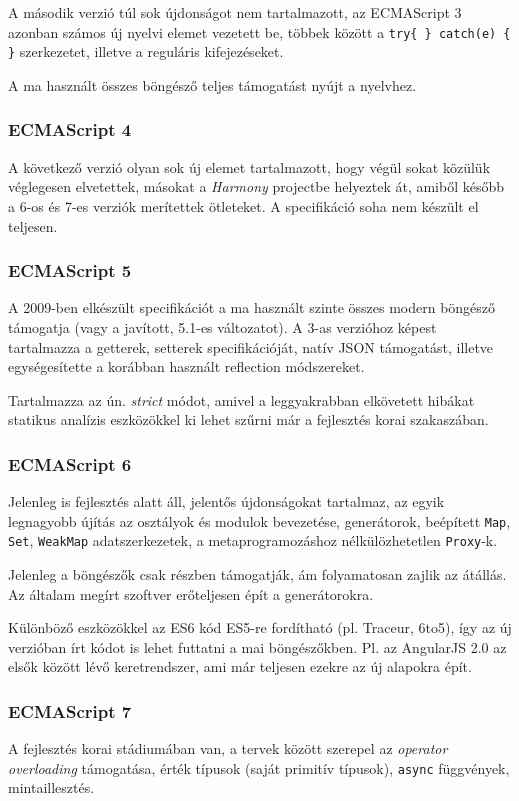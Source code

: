 A második verzió túl sok újdonságot nem tartalmazott, az ECMAScript 3 azonban
számos új nyelvi elemet vezetett be\cite{ECMAScript-3}, többek között
a \verb=try{ } catch(e) { }= szerkezetet, illetve a reguláris kifejezéseket.

A ma használt összes böngésző teljes támogatást nyújt a nyelvhez.

\subsubsection{ECMAScript 4}

A következő verzió olyan sok új elemet tartalmazott, hogy végül sokat közülük
véglegesen elvetettek, másokat a \emph{Harmony} projectbe helyeztek át,
amiből később a 6-os és 7-es verziók merítettek ötleteket.
A specifikáció soha nem készült el teljesen.

\subsubsection{ECMAScript 5}

A 2009-ben elkészült specifikációt a ma használt szinte összes modern böngésző 
támogatja (vagy a javított, 5.1-es változatot\cite{ECMAScript-5}).
A 3-as verzióhoz képest tartalmazza a getterek, setterek specifikációját,
natív JSON támogatást, illetve egységesítette a korábban használt
reflection módszereket.

Tartalmazza az ún. \emph{strict} módot, amivel a leggyakrabban elkövetett
hibákat statikus analízis eszközökkel ki lehet szűrni már a fejlesztés korai
szakaszában.

\subsubsection{ECMAScript 6}

Jelenleg is fejlesztés alatt áll\cite{ECMAScript-6},
jelentős újdonságokat tartalmaz, az egyik legnagyobb újítás az osztályok
és modulok bevezetése, generátorok, beépített \verb=Map=, \verb=Set=,
\verb=WeakMap= adatszerkezetek, a metaprogramozáshoz nélkülözhetetlen
\verb=Proxy=-k.

Jelenleg a böngészők csak részben támogatják, ám folyamatosan zajlik az átállás.
Az általam megírt szoftver erőteljesen épít a generátorokra.

Különböző eszközökkel az ES6 kód ES5-re fordítható (pl. Traceur, 6to5), így
az új verzióban írt kódot is lehet futtatni a mai böngészőkben.
Pl. az AngularJS 2.0 az elsők között lévő keretrendszer,
ami már teljesen ezekre az új alapokra épít.

\subsubsection{ECMAScript 7}

A fejlesztés korai stádiumában van, a tervek között szerepel az \emph{operator
overloading} támogatása, érték típusok (saját primitív típusok), \verb=async=
függvények, mintaillesztés.
